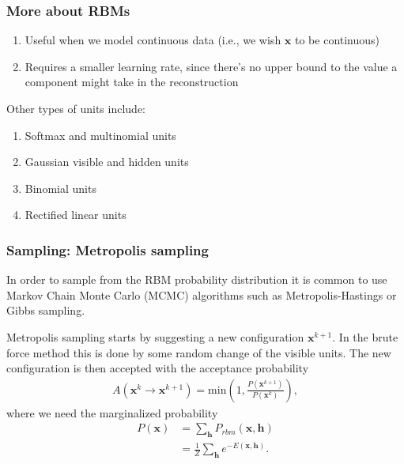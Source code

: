 \documentclass{beamer}
\begin{document}
\begin{frame}
\frametitle{More about RBMs}

\begin{enumerate}
\item Useful when we model continuous data (i.e., we wish $\mathbf{x}$ to be continuous)

\item Requires a smaller learning rate, since there's no upper bound to the value a component might take in the reconstruction
\end{enumerate}

\noindent
Other types of units include:
\begin{enumerate}
\item Softmax and multinomial units

\item Gaussian visible and hidden units

\item Binomial units

\item Rectified linear units
\end{enumerate}

\noindent
\end{frame}

\begin{frame}
\frametitle{Sampling: Metropolis sampling}

In order to sample from the RBM probability distribution it is common to use Markov Chain Monte Carlo (MCMC) algorithms such as Metropolis-Hastings or Gibbs sampling.



Metropolis sampling starts by suggesting a new configuration $\bm{x}^{k+1}$. In the brute force method this is done by some random change of the visible units. The new configuration is then accepted with the acceptance probability
\begin{align}
	A(\bm{x}^k \rightarrow \bm{x}^{k+1}) = \text{min} (1, \frac{P(\bm{x}^{k+1})}{P(\bm{x}^k)}),
\end{align} 
where we need the marginalized probability
\begin{align}
	P(\bm{x})  &= \sum_\mathbf{h} P_{rbm}(\mathbf{x}, \mathbf{h}) \\
				&= \frac{1}{Z}\sum_\mathbf{h} e^{-E(\mathbf{x}, \mathbf{h})}.
\end{align}
\end{frame}
\end{document}
